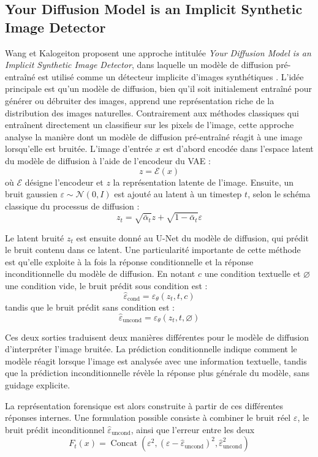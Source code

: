 \documentclass[runningheads]{llncs}
\begin{document}
\subsection{Your Diffusion Model is an Implicit Synthetic Image Detector}

Wang et Kalogeiton proposent une approche intitulée \textit{Your Diffusion Model is an Implicit Synthetic Image Detector}\citep{wang}, dans laquelle un modèle de diffusion pré-entraîné est utilisé comme un détecteur implicite d'images synthétiques . L'idée principale est qu'un modèle de diffusion, bien qu'il soit initialement entraîné pour générer ou débruiter des images, apprend une représentation riche de la distribution des images naturelles. Contrairement aux méthodes classiques qui entraînent directement un classifieur sur les pixels de l'image, cette approche analyse la manière dont un modèle de diffusion pré-entraîné réagit à une image lorsqu'elle est bruitée. L'image d'entrée $x$ est d'abord encodée dans l'espace latent du modèle de diffusion à l'aide de l'encodeur du VAE :
$$
    z = \mathcal{E}(x)
$$
où $\mathcal{E}$ désigne l'encodeur et $z$ la représentation latente de l'image. Ensuite, un bruit gaussien $\varepsilon \sim \mathcal{N}(0,I)$ est ajouté au latent à un timestep $t$, selon le schéma classique du processus de diffusion :
$$
    z_t =\sqrt{\bar{\alpha}_t}z+\sqrt{1-\bar{\alpha}_t}\varepsilon
$$

 Le latent bruité $z_t$ est ensuite donné au U-Net du modèle de diffusion, qui prédit le bruit contenu dans ce latent. Une particularité importante de cette méthode est qu'elle exploite à la fois la réponse conditionnelle et la réponse inconditionnelle du modèle de diffusion. En notant $c$ une condition textuelle et $\varnothing$ une condition vide, le bruit prédit sous condition est :
$$
    \hat{\varepsilon}_{\text{cond}}=\varepsilon_\theta(z_t,t,c)
$$
tandis que le bruit prédit sans condition est :
$$
    \hat{\varepsilon}_{\text{uncond}}=\varepsilon_\theta(z_t,t,\varnothing)
$$

Ces deux sorties traduisent deux manières différentes pour le modèle de diffusion d'interpréter l'image bruitée. La prédiction conditionnelle indique comment le modèle réagit lorsque l'image est analysée avec une information textuelle, tandis que la prédiction inconditionnelle révèle la réponse plus générale du modèle, sans guidage explicite.

La représentation forensique est alors construite à partir de ces différentes réponses internes. Une formulation possible consiste à combiner le bruit réel $\varepsilon$, le bruit prédit inconditionnel $\hat{\varepsilon}_{\text{uncond}}$, ainsi que l'erreur entre les deux 
$$
    F_t(x)=\operatorname{Concat}\left(\varepsilon^2,(\varepsilon-\hat{\varepsilon}_{\text{uncond}})^2,\hat{\varepsilon}_{\text{uncond}}^2\right)
$$
\end{document}
